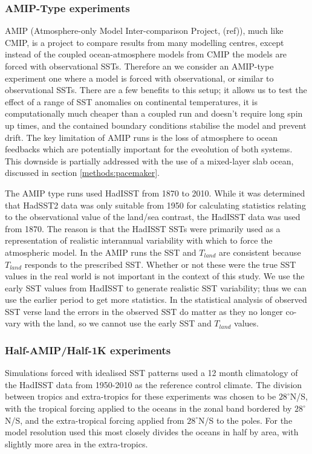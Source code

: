 \subsubsection{AMIP-Type experiments}\label{methods:amip}
AMIP (Atmosphere-only Model Inter-comparison Project, (ref)), much like CMIP, is 
a project to compare results from many modelling centres, except instead of the 
coupled ocean-atmosphere models from CMIP the models are forced with 
observational SSTs.  Therefore an we consider an AMIP-type experiment one where 
a model is forced with observational, or similar to observational SSTs. There 
are a few benefits to this setup; it allows us to test the effect of a range of 
SST anomalies on continental temperatures, it is computationally much cheaper 
than a coupled run and doesn't require long spin up times, and the contained 
boundary conditions stabilise the model and prevent drift. The key limitation of 
AMIP runs is the loss of atmosphere to ocean feedbacks which are potentially 
important for the eveolution of both systems. This downside is partially 
addressed with the use of a mixed-layer slab ocean, discussed in section 
\ref{methods:pacemaker}.

The AMIP type runs used HadISST from 1870 to 2010. While it was determined that 
HadSST2 data was only suitable from 1950 for calculating statistics relating to 
the observational value of the land/sea contrast, the HadISST data was used from 
1870. The reason is that the HadISST SSTs were primarily used as a 
representation of realistic interannual variability with which to force the 
atmospheric model.  In the AMIP runs the SST and $T_{land}$ are consistent 
because $T_{land}$ responds to the prescribed SST.  Whether or not these were 
the true SST values in the real world is not important in the context of this 
study.  We use the early SST values from HadISST to generate realistic SST 
variability; thus we can use the earlier period to get more statistics. In the 
statistical analysis of observed SST verse land the errors in the observed SST 
do matter as they no longer co-vary with the land, so we cannot use the early 
SST and $T_{land}$ values.

\subsubsection{Half-AMIP/Half-1K experiments}
Simulations forced with idealised SST patterns used a 12 month climatology of 
the HadISST data from 1950-2010 as the reference control climate. The division 
between tropics and extra-tropics for these experiments was chosen to be 
$28^{\circ}$N/S, with the tropical forcing applied to the oceans in the zonal 
band bordered by $28^{\circ}$N/S, and the extra-tropical forcing applied from 
$28^{\circ}$N/S to the poles. For the model resolution used this most closely 
divides the oceans in half by area, with slightly more area in the 
extra-tropics.

